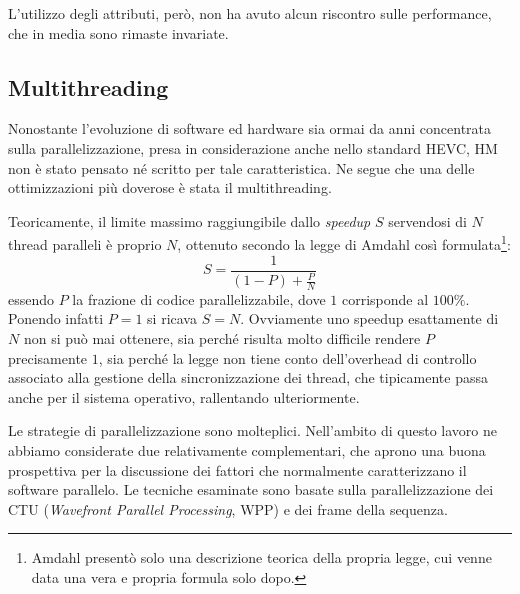 L'utilizzo degli attributi, però, non ha avuto alcun riscontro sulle 
performance, che in media sono rimaste invariate. \\
\label{sect-multi}\subsection{Multithreading}
Nonostante l'evoluzione di software ed hardware sia ormai da anni concentrata 
sulla parallelizzazione, presa in considerazione anche nello standard HEVC, HM 
non è stato 
pensato né scritto per tale 
caratteristica. Ne segue che una delle ottimizzazioni più doverose è stata il 
multithreading.
\par Teoricamente, il limite massimo raggiungibile dallo \emph{speedup} $S$ 
servendosi 
di $N$ thread paralleli è proprio $N$, ottenuto secondo la legge di Amdahl 
così formulata\footnote{Amdahl presentò solo una descrizione teorica della 
propria legge, cui venne data una vera e propria formula solo dopo.}:
$$S = \frac{1}{(1-P)+\frac{P}{N}}$$
essendo $P$ la frazione di codice parallelizzabile, dove $1$ corrisponde al 
$100\%$. Ponendo infatti $P = 1$ si ricava $S = N$. Ovviamente uno speedup 
esattamente di $N$ non si può mai ottenere, sia perché risulta molto difficile 
rendere 
$P$ precisamente $1$, sia perché la legge non tiene conto dell'overhead di 
controllo associato alla gestione della sincronizzazione dei thread, che 
tipicamente passa anche per il sistema operativo, rallentando ulteriormente.
\par Le strategie di parallelizzazione sono molteplici. Nell'ambito di questo 
lavoro ne abbiamo considerate due relativamente complementari, che aprono
una buona prospettiva per la discussione dei fattori che normalmente 
caratterizzano il software parallelo. Le tecniche esaminate sono basate sulla 
parallelizzazione dei CTU (\emph{Wavefront Parallel Processing}, WPP) e dei 
frame della sequenza.

